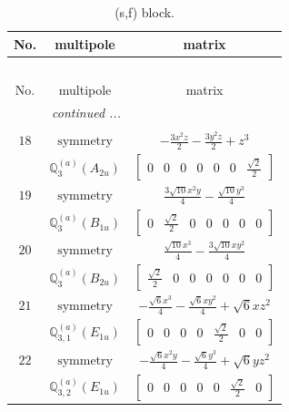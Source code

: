 \documentclass[fleqn,8pt,landscape]{jsarticle}
\begin{document}
\begin{longtable}{ccc}
\caption{(s,f) block.}
 \\
 \hline \hline
No. & multipole & matrix \\ \hline \endfirsthead

\multicolumn{2}{l}{\tablename\ \thetable{}} \\
 \hline \hline
No. & multipole & matrix \\ \hline \endhead

 \hline \hline
\multicolumn{2}{r}{\footnotesize\it continued ...} \\ \endfoot

 \hline \hline
\multicolumn{2}{r}{} \\ \endlastfoot

$ 18 $ & $ \text{symmetry} $ & $ - \frac{3 x^{2} z}{2} - \frac{3 y^{2} z}{2} + z^{3} $ \\
$  $ & $ \mathbb{Q}_{3}^{(a)}(A_{2u}) $ & $ \begin{bmatrix} 0 & 0 & 0 & 0 & 0 & 0 & \frac{\sqrt{2}}{2} \end{bmatrix} $ \\ \hline
$ 19 $ & $ \text{symmetry} $ & $ \frac{3 \sqrt{10} x^{2} y}{4} - \frac{\sqrt{10} y^{3}}{4} $ \\
$  $ & $ \mathbb{Q}_{3}^{(a)}(B_{1u}) $ & $ \begin{bmatrix} 0 & \frac{\sqrt{2}}{2} & 0 & 0 & 0 & 0 & 0 \end{bmatrix} $ \\ \hline
$ 20 $ & $ \text{symmetry} $ & $ \frac{\sqrt{10} x^{3}}{4} - \frac{3 \sqrt{10} x y^{2}}{4} $ \\
$  $ & $ \mathbb{Q}_{3}^{(a)}(B_{2u}) $ & $ \begin{bmatrix} \frac{\sqrt{2}}{2} & 0 & 0 & 0 & 0 & 0 & 0 \end{bmatrix} $ \\ \hline
$ 21 $ & $ \text{symmetry} $ & $ - \frac{\sqrt{6} x^{3}}{4} - \frac{\sqrt{6} x y^{2}}{4} + \sqrt{6} x z^{2} $ \\
$  $ & $ \mathbb{Q}_{3,1}^{(a)}(E_{1u}) $ & $ \begin{bmatrix} 0 & 0 & 0 & 0 & \frac{\sqrt{2}}{2} & 0 & 0 \end{bmatrix} $ \\ \hline
$ 22 $ & $ \text{symmetry} $ & $ - \frac{\sqrt{6} x^{2} y}{4} - \frac{\sqrt{6} y^{3}}{4} + \sqrt{6} y z^{2} $ \\
$  $ & $ \mathbb{Q}_{3,2}^{(a)}(E_{1u}) $ & $ \begin{bmatrix} 0 & 0 & 0 & 0 & 0 & \frac{\sqrt{2}}{2} & 0 \end{bmatrix} $ \\ \hline

\end{longtable}
\end{document}
